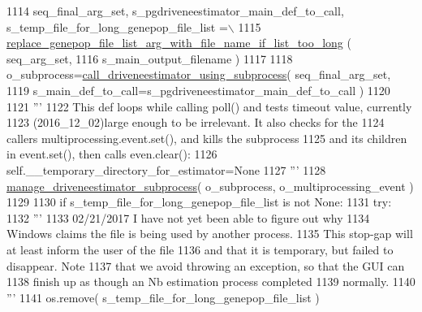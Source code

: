 \begin{DoxyCode}
1114         seq\_final\_arg\_set, s\_pgdriveneestimator\_main\_def\_to\_call, s\_temp\_file\_for\_long\_genepop\_file\_list =\(\backslash\)
1115                 \hyperlink{namespacenegui_1_1pgutilities_af0416d36a2f9a99c1658b47c5d35ac6c}{replace\_genepop\_file\_list\_arg\_with\_file\_name\_if\_list\_too\_long}
      ( seq\_arg\_set,
1116                                                                                 s\_main\_output\_filename )
1117 
1118         o\_subprocess=\hyperlink{namespacenegui_1_1pgutilities_ad33c328d8fe2b8fe9489c512c18d1765}{call\_driveneestimator\_using\_subprocess}( 
      seq\_final\_arg\_set, 
1119                                             s\_main\_def\_to\_call=s\_pgdriveneestimator\_main\_def\_to\_call )
1120 
1121         \textcolor{stringliteral}{'''}
1122 \textcolor{stringliteral}{        This def loops while calling poll() and tests timeout value, currently}
1123 \textcolor{stringliteral}{        (2016\_12\_02)large enough to be irrelevant.  It also checks for the }
1124 \textcolor{stringliteral}{        callers multiprocessing.event.set(), and kills the subprocess}
1125 \textcolor{stringliteral}{        and its children in event.set(), then calls even.clear():}
1126 \textcolor{stringliteral}{        self.\_\_temporary\_directory\_for\_estimator=None}
1127 \textcolor{stringliteral}{        '''}
1128         \hyperlink{namespacenegui_1_1pgutilities_aa62ddf0928a977844669e59f5b4e3329}{manage\_driveneestimator\_subprocess}( o\_subprocess, 
      o\_multiprocessing\_event )
1129 
1130         \textcolor{keywordflow}{if} s\_temp\_file\_for\_long\_genepop\_file\_list \textcolor{keywordflow}{is} \textcolor{keywordflow}{not} \textcolor{keywordtype}{None}:
1131             \textcolor{keywordflow}{try}:
1132                 \textcolor{stringliteral}{'''}
1133 \textcolor{stringliteral}{                02/21/2017 I have not yet been able to figure out why }
1134 \textcolor{stringliteral}{                Windows claims the file is being used by another process.}
1135 \textcolor{stringliteral}{                This stop-gap will at least inform the user of the file}
1136 \textcolor{stringliteral}{                and that it is temporary, but failed to disappear. Note }
1137 \textcolor{stringliteral}{                that we avoid throwing an exception, so that the GUI can}
1138 \textcolor{stringliteral}{                finish up as though an Nb estimation process completed}
1139 \textcolor{stringliteral}{                normally.}
1140 \textcolor{stringliteral}{                '''}
1141                 os.remove( s\_temp\_file\_for\_long\_genepop\_file\_list )

\end{DoxyCode}
